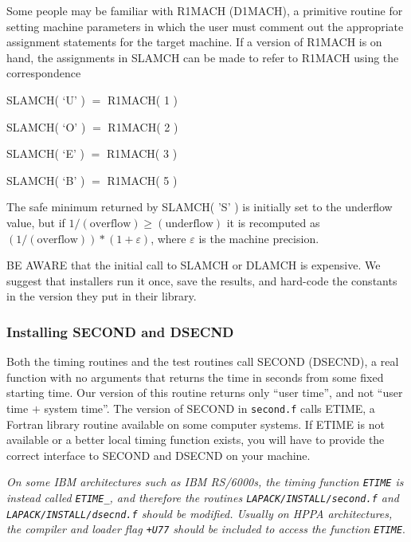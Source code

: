 \documentclass[11pt]{report}
\begin{document}
Some people may be familiar with R1MACH (D1MACH), a primitive
routine for setting machine parameters in which the user must
comment out the appropriate assignment statements for the target
machine.  If a version of R1MACH is on hand, the assignments in
SLAMCH can be made to refer to R1MACH using the correspondence

\begin{list}{}{}
\item {SLAMCH( `U' )}  $=$ R1MACH( 1 )
\item {SLAMCH( `O' )}  $=$ R1MACH( 2 )
\item {SLAMCH( `E' )}  $=$ R1MACH( 3 )
\item {SLAMCH( `B' )}  $=$ R1MACH( 5 )
\end{list}

\noindent
The safe minimum returned by SLAMCH( 'S' ) is initially set to the
underflow value, but if $1/(\mathrm{overflow}) \geq (\mathrm{underflow})$
it is recomputed as $(1/(\mathrm{overflow})) * ( 1 + \varepsilon )$,
where $\varepsilon$ is the machine precision.

BE AWARE that the initial call to SLAMCH or DLAMCH is expensive.  
We suggest that installers run it once, save the results, and hard-code
the constants in the version they put in their library.

\subsubsection{Installing SECOND and DSECND}\label{second}

Both the timing routines and the test routines call SECOND
(DSECND), a real function with no arguments that returns the time
in seconds from some fixed starting time.
Our version of this routine returns only ``user time'', and
not ``user time $+$ system time''. 
The version of SECOND in \texttt{second.f} calls ETIME, a Fortran library
routine available on some computer systems.
If ETIME is not available or a better local timing function exists,
you will have to provide the correct interface to SECOND and DSECND
on your machine.

\emph{On some IBM architectures such as IBM RS/6000s, the timing function
\texttt{ETIME} is instead called \texttt{ETIME\_}, and therefore the routines
\texttt{LAPACK/INSTALL/second.f} and \texttt{LAPACK/INSTALL/dsecnd.f} should
be modified.  Usually on HPPA architectures,
the compiler and loader flag \texttt{+U77} should be included to access
the function \texttt{ETIME}}.
\end{document}
